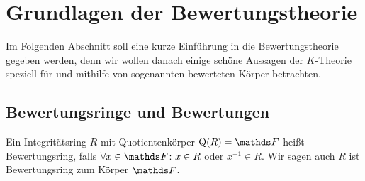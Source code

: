 \documentclass[ngerman,fontsize=11pt, paper=a4, parskip=half, titlepage=true, toc=bib]{scrartcl}
\begin{document}

\section{Grundlagen der Bewertungstheorie}

Im Folgenden Abschnitt soll eine kurze Einführung in die
Bewertungstheorie gegeben werden, denn wir wollen danach einige schöne
Aussagen der $K$-Theorie speziell für und mithilfe von sogenannten
bewerteten Körper betrachten.

\subsection{Bewertungsringe und Bewertungen}

\begin{Def}[Bewertungsring]\label{defbewertungsring}
  Ein Integritätsring $R$ mit Quotientenkörper $\Quot(R)=\F$ heißt
  Bewertungsring, falls $\forall x\in\F\colon x\in R$ oder
  $x^{-1}\in R$.
  Wir sagen auch $R$ ist Bewertungsring zum Körper $\F$.
\end{Def}
\end{document}
